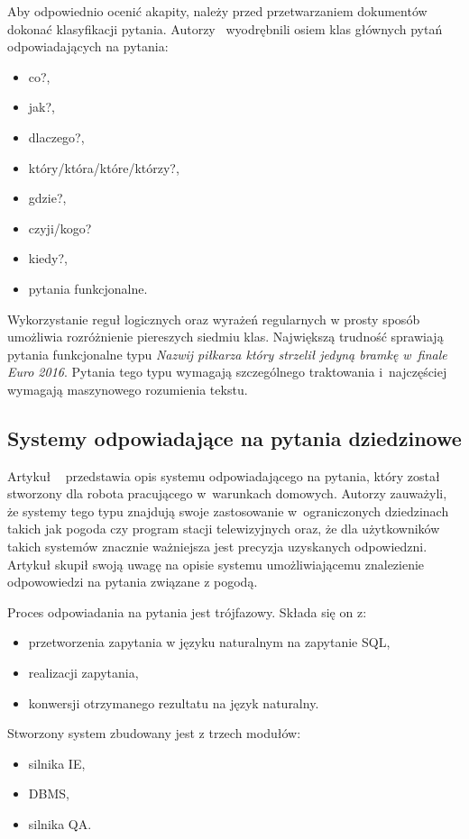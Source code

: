 Aby odpowiednio ocenić akapity, należy przed przetwarzaniem dokumentów dokonać klasyfikacji pytania. Autorzy~\cite{gupta2012survey} wyodrębnili osiem klas głównych pytań odpowiadających na pytania:
\begin{itemize}
	\item co?,
	\item jak?,
	\item dlaczego?,
	\item który/która/które/którzy?,
	\item gdzie?,
	\item czyji/kogo?
	\item kiedy?,
	\item pytania funkcjonalne.
\end{itemize}

Wykorzystanie reguł logicznych oraz wyrażeń regularnych w prosty sposób umożliwia rozróżnienie piereszych siedmiu klas. Największą trudność sprawiają pytania funkcjonalne typu \emph{Nazwij piłkarza który strzelił jedyną bramkę w~finale Euro 2016}. Pytania tego typu wymagają szczególnego traktowania i~najczęściej wymagają maszynowego rozumienia tekstu\cite{gupta2012survey}.

\subsection{Systemy odpowiadające na pytania dziedzinowe}\label{subsec:lit:res}

Artykuł ~\cite{restrictedWeather} przedstawia opis systemu odpowiadającego na pytania, który został stworzony dla robota pracującego w~warunkach domowych. Autorzy zauważyli, że systemy tego typu znajdują swoje zastosowanie w~ograniczonych dziedzinach takich jak pogoda czy program stacji telewizyjnych oraz, że dla użytkowników takich systemów znacznie ważniejsza jest precyzja uzyskanych odpowiedzni. Artykuł skupił swoją uwagę na opisie systemu umożliwiającemu znalezienie odpowowiedzi na pytania związane z pogodą. 

Proces odpowiadania na pytania jest trójfazowy. Składa się on z: 
\begin{itemize}
	\item przetworzenia zapytania w języku naturalnym na zapytanie SQL,
	\item realizacji zapytania,
	\item konwersji otrzymanego rezultatu na język naturalny.
\end{itemize}
Stworzony system zbudowany jest z trzech modułów: 
\begin{itemize}
	\item silnika IE, 
	\item DBMS, 
	\item silnika QA.
\end{itemize}

